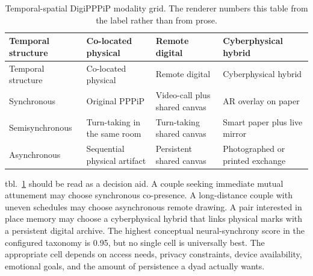 \documentclass[
  english,
]{article}
\begin{document}
\begin{longtable}[]{@{}
  >{\raggedright\arraybackslash}p{}
  >{\raggedright\arraybackslash}p{}
  >{\raggedright\arraybackslash}p{}
  >{\raggedright\arraybackslash}p{}@{}}
\caption{Temporal-spatial DigiPPPiP modality grid. The renderer numbers
this table from the label rather than from
prose.}\label{tbl:taxonomy_modes}\tabularnewline
\toprule\noalign{}
\begin{minipage}[b]{\linewidth}\raggedright
Temporal structure
\end{minipage} & \begin{minipage}[b]{\linewidth}\raggedright
Co-located physical
\end{minipage} & \begin{minipage}[b]{\linewidth}\raggedright
Remote digital
\end{minipage} & \begin{minipage}[b]{\linewidth}\raggedright
Cyberphysical hybrid
\end{minipage} \\
\midrule\noalign{}
\endfirsthead
\toprule\noalign{}
\begin{minipage}[b]{\linewidth}\raggedright
Temporal structure
\end{minipage} & \begin{minipage}[b]{\linewidth}\raggedright
Co-located physical
\end{minipage} & \begin{minipage}[b]{\linewidth}\raggedright
Remote digital
\end{minipage} & \begin{minipage}[b]{\linewidth}\raggedright
Cyberphysical hybrid
\end{minipage} \\
\midrule\noalign{}
\endhead
\bottomrule\noalign{}
\endlastfoot
Synchronous & Original PPPiP & Video-call plus shared canvas & AR
overlay on paper \\
Semisynchronous & Turn-taking in the same room & Turn-taking shared
canvas & Smart paper plus live mirror \\
Asynchronous & Sequential physical artifact & Persistent shared canvas &
Photographed or printed exchange \\
\end{longtable}

tbl.~\ref{tbl:taxonomy_modes} should be read as a decision aid. A couple
seeking immediate mutual attunement may choose synchronous co-presence.
A long-distance couple with uneven schedules may choose asynchronous
remote drawing. A pair interested in place memory may choose a
cyberphysical hybrid that links physical marks with a persistent digital
archive. The highest conceptual neural-synchrony score in the configured
taxonomy is 0.95, but no single cell is universally best. The
appropriate cell depends on access needs, privacy constraints, device
availability, emotional goals, and the amount of persistence a dyad
actually wants.
\end{document}
